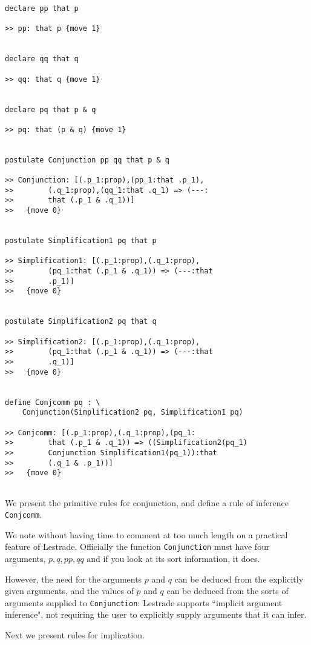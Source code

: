 \documentclass[12pt]{slides}
\begin{document}
\begin{slide}
{\tiny
\begin{verbatim}
declare pp that p 

>> pp: that p {move 1}


declare qq that q

>> qq: that q {move 1}


declare pq that p & q

>> pq: that (p & q) {move 1}


postulate Conjunction pp qq that p & q

>> Conjunction: [(.p_1:prop),(pp_1:that .p_1),
>>        (.q_1:prop),(qq_1:that .q_1) => (---:
>>        that (.p_1 & .q_1))]
>>   {move 0}


postulate Simplification1 pq that p

>> Simplification1: [(.p_1:prop),(.q_1:prop),
>>        (pq_1:that (.p_1 & .q_1)) => (---:that 
>>        .p_1)]
>>   {move 0}


postulate Simplification2 pq that q

>> Simplification2: [(.p_1:prop),(.q_1:prop),
>>        (pq_1:that (.p_1 & .q_1)) => (---:that 
>>        .q_1)]
>>   {move 0}


define Conjcomm pq : \
    Conjunction(Simplification2 pq, Simplification1 pq)

>> Conjcomm: [(.p_1:prop),(.q_1:prop),(pq_1:
>>        that (.p_1 & .q_1)) => ((Simplification2(pq_1) 
>>        Conjunction Simplification1(pq_1)):that 
>>        (.q_1 & .p_1))]
>>   {move 0}


\end{verbatim}

}
\end{slide}

\begin{slide}

We present the primitive rules for conjunction, and define a rule of inference {\tt Conjcomm}.

We note without having time to comment at too much length on a practical feature of Lestrade.  Officially the function
{\tt Conjunction} must have four arguments, $p, q, pp, qq$ and if you look at its sort information, it does.

However, the need for the arguments $p$ and $q$ can be deduced from the explicitly given arguments, and the values of $p$
and $q$ can be deduced from the sorts of arguments supplied to {\tt Conjunction}:  Lestrade supports ``implicit argument inference",
not requiring the user to explicitly supply arguments that it can infer.

Next we present rules for implication.

\end{slide}
\end{document}
